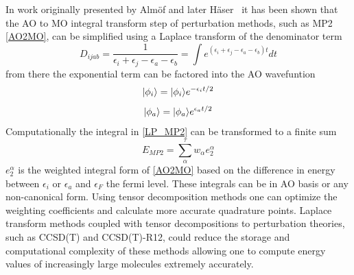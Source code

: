 	In work originally presented by Alm{\"o}f\cite{Almlof1991} and later H{\"a}ser\
	\cite{Haser1992} it has been shown that the AO to MO integral transform step of perturbation methods, such as MP2 \cref{AO2MO}, can be simplified using a Laplace transform of the denominator term
		\begin{equation}\label{LP_MP2}
			D_{ijab} = \frac{1}{\epsilon_i + \epsilon_j - \epsilon_a - \epsilon_b} = \int e^{(\epsilon_i + \epsilon_j - \epsilon_a - \epsilon_b)t}dt
		\end{equation}
	from there the exponential term can be factored into the AO wavefuntion
		\begin{equation}
			| \phi_i \rangle = | \phi_i \rangle e^{-\epsilon_i t/2}
		\end{equation}
		\begin{equation}
			| \phi_a \rangle = | \phi_a \rangle e^{\epsilon_a t/2}
		\end{equation}
	Computationally the integral in \cref{LP_MP2} can be transformed to a finite sum
		\begin{equation}
			E_{MP2} = \sum_\alpha^\tau w_\alpha e_2^\alpha
		\end{equation}
	$e_2^\alpha$ is the weighted integral form of \cref{AO2MO} based on the difference in energy between $\epsilon_i$ or $\epsilon_a$ and $\epsilon_F$ the fermi level.  These integrals can be in AO basis or any non-canonical form.  Using tensor decomposition methods one can optimize the weighting coefficients and calculate more accurate quadrature points.  Laplace transform methods coupled with tensor decompositions to perturbation theories, such as CCSD(T) and CCSD(T)-R12, could reduce the storage and computational complexity of these methods allowing one to compute energy values of increasingly large molecules extremely accurately.